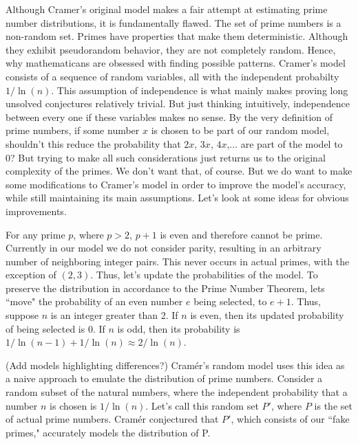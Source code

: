 \documentclass[conference]{IEEEtran}
\begin{document}
Although Cramer's original model makes a fair attempt at estimating prime number distributions, it is fundamentally flawed. The set of prime numbers is a non-random set. Primes have properties that make them deterministic. Although they exhibit pseudorandom behavior, they are not completely random. Hence, why mathematicans are obsessed with finding possible patterns. Cramer's model consists of a sequence of random variables, all with the independent probabilty $1 / \ln(n)$. This assumption of independence is what mainly makes proving long unsolved conjectures relatively trivial. But just thinking intuitively, independence between every one if these variables makes no sense. By the very definition of prime numbers, if some number $x$ is chosen to be part of our random model, shouldn't this reduce the probability that $2x$, $3x$, $4x$,$\dots$ are part of the model to 0? But trying to make all such considerations just returns us to the original complexity of the primes. We don't want that, of course. But we do want to make some modifications to Cramer's model in order to improve the model's accuracy, while still maintaining its main assumptions. Let's look at some ideas for obvious improvements. 

For any prime $p$, where $p > 2$, $p + 1$ is even and therefore cannot be prime. Currently in our model we do not consider parity, resulting in an arbitrary number of neighboring integer pairs. This never occurs in actual primes, with the exception of $(2, 3)$. Thus, let's update the probabilities of the model. To preserve the distribution in accordance to the Prime Number Theorem, lets ``move" the probability of an even number $e$ being selected, to $e + 1$. Thus, suppose $n$ is an integer greater than 2. If $n$ is even, then its updated probability of being selected is 0. If $n$ is odd, then its probability is $1 / \ln(n - 1) + 1 / \ln(n) \approx 2 / \ln(n)$.


(Add models highlighting differences?)
Cram\'er's random model uses this idea as a naive approach to emulate the distribution of prime numbers. Consider a random subset of the natural numbers, where the independent probability that a number $n$ is chosen is $1 / \ln(n)$. Let's call this random set $P'$, where $P$ is the set of actual prime numbers. Cram\'er conjectured that $P'$, which consists of our ``fake primes," accurately models the distribution of P. 
\end{document}

